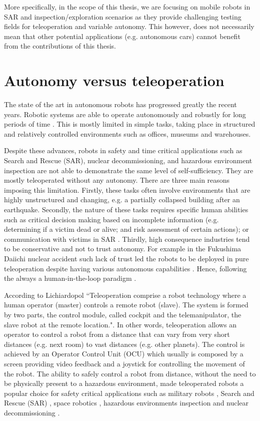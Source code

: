 \documentclass[a4paper,12pt,oneside,openright]{bhamthesis}
\begin{document}
More specifically, in the scope of this thesis, we are focusing on mobile robots in SAR and inspection/exploration scenarios as they provide challenging testing fields for teleoperation and variable autonomy. This however, does not necessarily mean that other potential applications (e.g. autonomous cars) cannot benefit from the contributions of this thesis.

\section{Autonomy versus teleoperation}
The state of the art in autonomous robots has progressed greatly the recent years. Robotic systems are able to operate autonomously and robustly for long periods of time \cite{Marder-Eppstein2010}. This is mostly limited in simple tasks, taking place in structured and relatively controlled environments such as offices, museums and warehouses.

Despite these advances, robots in safety and time critical applications such as Search and Rescue (SAR), nuclear decommissioning, and hazardous environment inspection are not able to demonstrate the same level of self-sufficiency. They are mostly teleoperated without any autonomy. There are three main reasons imposing this limitation. Firstly, these tasks often involve environments that are highly unstructured and changing, e.g. a partially collapsed building after an earthquake. Secondly, the nature of these tasks requires specific human abilities such as critical decision making based on incomplete information (e.g. determining if a victim dead or alive; and risk assessment of certain actions); or communication with victims in SAR \cite{Dole2015}. Thirdly, high consequence industries tend to be conservative and not to trust autonomy. For example in the Fukushima Daiichi nuclear accident such lack of trust led the robots to be deployed in pure teleoperation despite having various autonomous capabilities \cite{Nagatani2013}. Hence, following the always a human-in-the-loop paradigm \cite{Murphy2004}.

According to Lichiardopol \cite{Lichiardopol2007} ``Teleoperation comprise a robot technology where a human operator (master) controls a remote robot (slave). The system is formed by two parts, the control module, called cockpit and the telemanipulator, the slave robot at the remote location.". In other words, teleoperation allows an operator to control a robot from a distance that can vary from very short distances (e.g. next room) to vast distances (e.g. other planets). The control is achieved by an Operator Control Unit (OCU) which usually is composed by a screen providing video feedback and a joystick for controlling the movement of the robot. The ability to safely control a robot from distance, without the need to be physically present to a hazardous environment, made teleoperated robots a popular choice for safety critical applications such as military robots \cite{Khurshid2004}, Search and Rescue (SAR) \cite{Blitch1996,kadous2005caster,Murphy2004}, space robotics \cite{Sheridan1993}, hazardous environments inspection \cite{Bruemmer2003a} and nuclear decommissioning \cite{Seward2005}.
\end{document}
